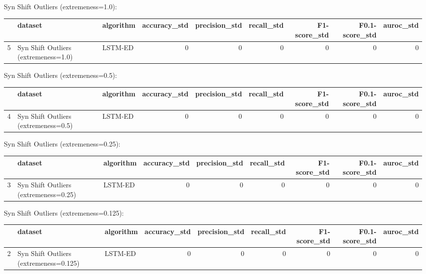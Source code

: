 Syn Shift Outliers (extremeness=1.0):

\begin{tabular}{rllrrrrrr}
\hline
    & dataset                              & algorithm   &   accuracy\_std &   precision\_std &   recall\_std &   F1-score\_std &   F0.1-score\_std &   auroc\_std \\
\hline
  5 & Syn Shift Outliers (extremeness=1.0) & LSTM-ED     &              0 &               0 &            0 &              0 &                0 &           0 \\
\hline
\end{tabular}

Syn Shift Outliers (extremeness=0.5):

\begin{tabular}{rllrrrrrr}
\hline
    & dataset                              & algorithm   &   accuracy\_std &   precision\_std &   recall\_std &   F1-score\_std &   F0.1-score\_std &   auroc\_std \\
\hline
  4 & Syn Shift Outliers (extremeness=0.5) & LSTM-ED     &              0 &               0 &            0 &              0 &                0 &           0 \\
\hline
\end{tabular}

Syn Shift Outliers (extremeness=0.25):

\begin{tabular}{rllrrrrrr}
\hline
    & dataset                               & algorithm   &   accuracy\_std &   precision\_std &   recall\_std &   F1-score\_std &   F0.1-score\_std &   auroc\_std \\
\hline
  3 & Syn Shift Outliers (extremeness=0.25) & LSTM-ED     &              0 &               0 &            0 &              0 &                0 &           0 \\
\hline
\end{tabular}

Syn Shift Outliers (extremeness=0.125):

\begin{tabular}{rllrrrrrr}
\hline
    & dataset                                & algorithm   &   accuracy\_std &   precision\_std &   recall\_std &   F1-score\_std &   F0.1-score\_std &   auroc\_std \\
\hline
  2 & Syn Shift Outliers (extremeness=0.125) & LSTM-ED     &              0 &               0 &            0 &              0 &                0 &           0 \\
\hline
\end{tabular}

